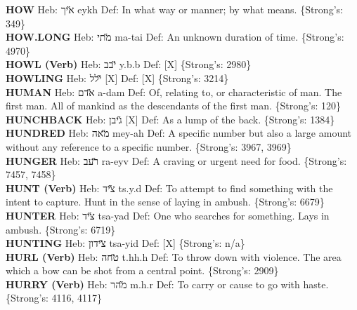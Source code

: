 {\textbf{HOW} Heb: {\large\H איך} eykh Def: In what way or manner; by what means. \{Strong's: 349\}\hfill{}\\

\textbf{HOW.LONG} Heb: {\large\H מתי} ma-tai Def: An unknown duration of time. \{Strong's: 4970\}\hfill{}\\

\textbf{HOWL (Verb)} Heb: {\large\H יבב} y.b.b Def: {[}X{]} \{Strong's: 2980\}\hfill{}\\

\textbf{HOWLING} Heb: {\large\H ילל} {[}X{]} Def: {[}X{]} \{Strong's: 3214\}\hfill{}\\

\textbf{HUMAN} Heb: {\large\H אדם} a-dam Def: Of, relating to, or characteristic of man. The first man. All of mankind as the descendants of the first man. \{Strong's: 120\}\hfill{}\\

\textbf{HUNCHBACK} Heb: {\large\H גיבן} {[}X{]} Def: As a lump of the back. \{Strong's: 1384\}\hfill{}\\

\textbf{HUNDRED} Heb: {\large\H מאה} mey-ah Def: A specific number but also a large amount without any reference to a specific number. \{Strong's: 3967, 3969\}\hfill{}\\

\textbf{HUNGER} Heb: {\large\H רעב} ra-eyv Def: A craving or urgent need for food. \{Strong's: 7457, 7458\}\hfill{}\\

\textbf{HUNT (Verb)} Heb: {\large\H ציד} ts.y.d Def: To attempt to find something with the intent to capture. Hunt in the sense of laying in ambush. \{Strong's: 6679\}\hfill{}\\

\textbf{HUNTER} Heb: {\large\H ציד} tsa-yad Def: One who searches for something. Lays in ambush. \{Strong's: 6719\}\hfill{}\\

\textbf{HUNTING} Heb: {\large\H צידון} tsa-yid Def: {[}X{]} \{Strong's: n/a\}\hfill{}\\

\textbf{HURL (Verb)} Heb: {\large\H טחה} t.hh.h Def: To throw down with violence. The area which a bow can be shot from a central point. \{Strong's: 2909\}\hfill{}\\

\textbf{HURRY (Verb)} Heb: {\large\H מהר} m.h.r Def: To carry or cause to go with haste. \{Strong's: 4116, 4117\}\hfill{}\\

}
